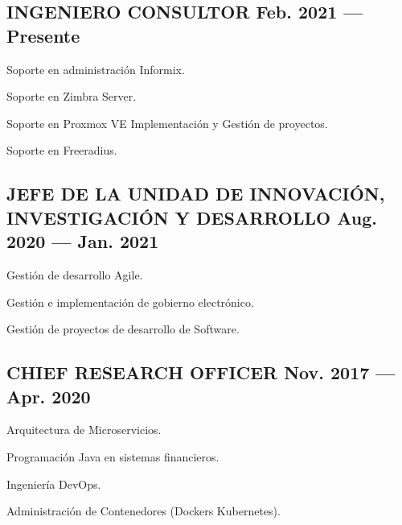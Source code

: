 \documentclass[letter,10pt]{article}
\begin{document}
\subsection{{INGENIERO CONSULTOR \hfill Feb. 2021 --- Presente}}
\begin{zitemize}
\item	Soporte en administración Informix.
\item	Soporte en Zimbra Server.
\item	Soporte en Proxmox VE Implementación y Gestión de proyectos.
\item	Soporte en Freeradius. 
\end{zitemize}
\vspace*{2mm}
\subsection{{JEFE DE LA UNIDAD DE INNOVACIÓN, INVESTIGACIÓN Y DESARROLLO \hfill Aug. 2020 --- Jan. 2021}}
\begin{zitemize}
\item Gestión de desarrollo Agile.
\item Gestión e implementación de gobierno electrónico.
\item Gestión de proyectos de desarrollo de Software.
\end{zitemize}
\vspace*{2mm}
\subsection{{CHIEF RESEARCH OFFICER \hfill Nov. 2017 --- Apr. 2020}}
\begin{zitemize}
\item Arquitectura de Microservicios.
\item Programación Java en sistemas financieros.
\item Ingeniería DevOps. 
\item Administración de Contenedores (Dockers Kubernetes).   
\end{zitemize}
\vspace*{2mm}
\end{document}
